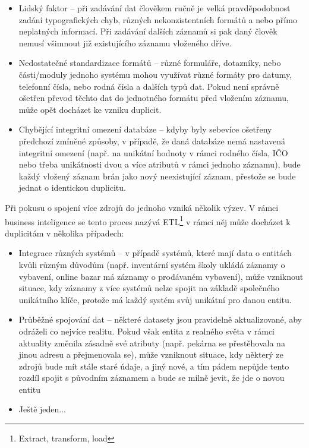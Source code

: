 \begin{itemize}
  \item Lidský faktor – při zadávání dat člověkem ručně je velká pravděpodobnost zadání typografických chyb, různých nekonzistentních formátů a nebo přímo neplatných informací. Při zadávání dalších záznamů si pak daný člověk nemusí všimnout již existujícího záznamu vloženého dříve.
  \item Nedostatečné standardizace formátů – různé formuláře, dotazníky, nebo části/moduly jednoho systému mohou využívat různé formáty pro datumy, telefonní čísla, nebo rodná čísla a dalších typů dat. Pokud není správně ošetřen převod těchto dat do jednotného formátu před vložením záznamu, může opět docházet ke vzniku duplicit.
  \item Chybějící integritní omezení databáze – kdyby byly sebevíce ošetřeny předchozí zmíněné způsoby, v případě, že daná databáze nemá nastavená integritní omezení (např. na unikátní hodnoty v rámci rodného čísla, IČO nebo třeba unikátnosti dvou a více atributů v rámci jednoho záznamu), bude každý vložený záznam brán jako nový neexistující záznam, přestože se bude jednat o identickou duplicitu.
\end{itemize}

Při pokusu o spojení více zdrojů do jednoho vzniká několik výzev. V rámci business inteligence se tento proces nazývá ETL\footnote{Extract, transform, load
} v rámci něj může docházet k duplicitám v několika případech:

\begin{itemize}
  \item Integrace různých systémů – v případě systémů, které mají data o entitách kvůli různým důvodům (např. inventární systém školy ukládá záznamy o vybavení, online bazar má záznamy o prodávaném vybavení), může vzniknout situace, kdy záznamy z více systémů nelze spojit na základě společného unikátního klíče, protože má každý systém svůj unikátní pro danou entitu.
  \item Průběžné spojování dat – některé datasety jsou pravidelně aktualizované, aby odráželi co nejvíce realitu. Pokud však entita z realného světa v rámci aktuality změnila zásadně své atributy (např. pekárna se přestěhovala na jinou adresu a přejmenovala se), může vzniknout situace, kdy některý ze zdrojů bude mít stále staré údaje, a jiný nové, a tím pádem nepůjde tento rozdíl spojit s původním záznamem a bude se milně jevit, že jde o novou entitu
  \item Ještě jeden...
\end{itemize}





